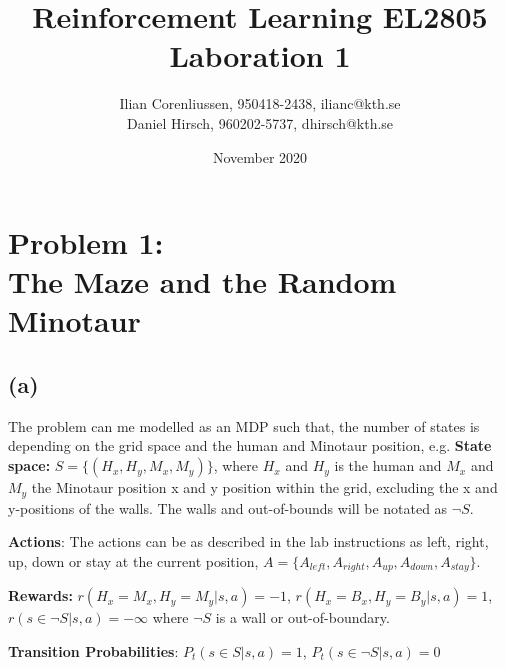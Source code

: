 \documentclass{article}
\title{Reinforcement Learning EL2805\\
       Laboration 1}
\author{Ilian Corenliussen, 950418-2438, ilianc@kth.se\\ 
        Daniel Hirsch, 960202-5737, dhirsch@kth.se}
\date{November 2020}
\begin{document}
\maketitle

\section*{Problem 1: \\
        The Maze and the Random Minotaur}
\subsection*{(a)}
The problem can me modelled as an MDP such that, the number of states is depending on the grid space and the human and Minotaur position, e.g. \textbf{State space:} $S = \{(H_x, H_y, M_x, M_y) \} $, where $H_x$ and $H_y$ is the human and $M_x$ and $M_y$ the Minotaur position x and y position within the grid, excluding the x and y-positions of the walls. The walls and out-of-bounds will be notated as $\neg S$.

\textbf{Actions}: The actions can be as described in the lab instructions as left, right, up, down or stay at the current position, $A = \{ A_{left}, A_{right}, A_{up}, A_{down}, A_{stay} \}$. 



\textbf{Rewards:} $r(H_x = M_x , H_y = M_y |s,a) = -1 $, $r(H_x = B_x , H_y = B_y |s,a) = 1 $, $r(s\in \neg S |s,a) = -\infty $ where $\neg S$ is a wall or out-of-boundary.

\textbf{Transition Probabilities}: $P_t(s \in S |s,a) = 1$, $P_t(s \in \neg S |s,a) = 0$  
\end{document}
